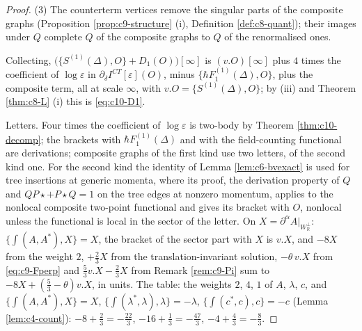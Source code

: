 \begin{proof}
(3) The counterterm vertices remove the singular parts of the composite graphs (Proposition \ref{prop:c9-structure} (i), Definition \ref{def:c8-quant}); their images under $Q$ complete $Q$ of the composite graphs to $Q$ of the renormalised ones.

Collecting, $\big(\{S^{(1)}(\Delta),O\}+D_1(O)\big)[\infty]$ is $(v.O)[\infty]$ plus $4$ times the coefficient of $\log\varepsilon$ in $\partial_\delta I^{CT}[\varepsilon](O)$, minus $\{\hbar F_1^{(1)}(\Delta),O\}$, plus the composite term, all at scale $\infty$, with $v.O=\{S^{(1)}(\Delta),O\}$; by (iii) and Theorem \ref{thm:c8-L} (i) this is \eqref{eq:c10-D1}.

Letters. Four times the coefficient of $\log\varepsilon$ is two-body by Theorem \ref{thm:c10-decomp}; the brackets with $\hbar F_1^{(1)}(\Delta)$ and with the field-counting functional are derivations; composite graphs of the first kind use two letters, of the second kind one. For the second kind the identity of Lemma \ref{lem:c6-bvexact} is used for tree insertions at generic momenta, where its proof, the derivation property of $Q$ and $QP\star+P\star Q=1$ on the tree edges at nonzero momentum, applies to the nonlocal composite two-point functional and gives its bracket with $O$, nonlocal unless the functional is local in the sector of the letter. On $X=\partial^\alpha A|_{W_{\mathbb R}^\perp}$: $\{\int(A,A^*),X\}=X$, the bracket of the sector part with $X$ is $v.X$, and $-8X$ from the weight $2$, $+\tfrac23X$ from the translation-invariant solution, $-\theta\,v.X$ from \eqref{eq:c9-Fperp} and $\tfrac53v.X-\tfrac23X$ from Remark \ref{rem:c9-Pi} sum to $-8X+(\tfrac53-\theta)v.X$, in units. The table: the weights $2$, $4$, $1$ of $A$, $\lambda$, $c$, and $\{\int(A,A^*),X\}=X$, $\{\int(\lambda^*,\lambda),\lambda\}=-\lambda$, $\{\int(c^*,c),c\}=-c$ (Lemma \ref{lem:c4-count}): $-8+\tfrac23=-\tfrac{22}3$, $-16+\tfrac13=-\tfrac{47}3$, $-4+\tfrac43=-\tfrac83$.
\end{proof}

